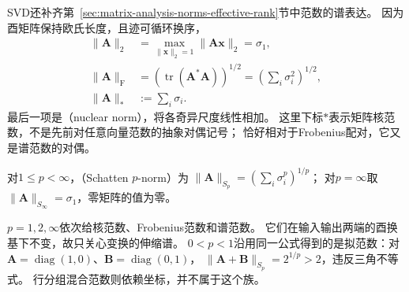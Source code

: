 SVD还补齐第~\ref{sec:matrix-analysis-norms-effective-rank}节中范数的谱表达。
因为酉矩阵保持欧氏长度，且迹可循环换序，
\begin{align}
 \lVert\bm A\rVert_2
 &=\max_{\lVert\bm x\rVert_2=1}\lVert\bm A\bm x\rVert_2=\sigma_1,
 \label{eq:matrix-analysis-spectral-norm}\\
 \lVert\bm A\rVert_{\mathrm F}
 &=\left(\operatorname{tr}(\bm A^*\bm A)\right)^{1/2}
   =\left(\sum_i\sigma_i^2\right)^{1/2},
 \label{eq:matrix-analysis-frobenius-norm}\\
 \lVert\bm A\rVert_*
 &:=\sum_i\sigma_i.
 \label{eq:matrix-analysis-nuclear-norm}
\end{align}
最后一项是（nuclear norm），将各奇异尺度线性相加。
这里下标$*$表示矩阵核范数，不是先前对任意向量范数的抽象对偶记号；
恰好相对于Frobenius配对，它又是谱范数的对偶。

\begin{definition}[Schatten范数]
\label{def:matrix-analysis-schatten-norm}
对$1\leq p<\infty$，（Schatten $p$-norm）为
$\lVert\bm A\rVert_{S_p}=(\sum_i\sigma_i^p)^{1/p}$；
对$p=\infty$取$\lVert\bm A\rVert_{S_\infty}=\sigma_1$，零矩阵的值为零。
\end{definition}
$p=1,2,\infty$依次给核范数、Frobenius范数和谱范数。
它们在输入输出两端的酉换基下不变，故只关心变换的伸缩谱。
$0<p<1$沿用同一公式得到的是拟范数：对
$\bm A=\operatorname{diag}(1,0)$、$\bm B=\operatorname{diag}(0,1)$，
$\lVert\bm A+\bm B\rVert_{S_p}=2^{1/p}>2$，违反三角不等式。
行分组混合范数则依赖坐标，并不属于这个族。

